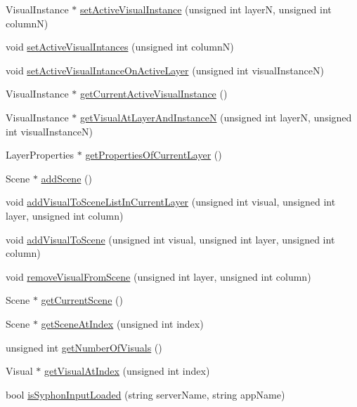 \begin{DoxyCompactItemize}
\item 
Visual\+Instance $\ast$ \hyperlink{class_engine_a8527a1c21e96b85c113efac943f83039}{set\+Active\+Visual\+Instance} (unsigned int layerN, unsigned int columnN)
\item 
void \hyperlink{class_engine_a9f4d3c2ac126aa622fa464300d1d361c}{set\+Active\+Visual\+Intances} (unsigned int columnN)
\item 
void \hyperlink{class_engine_a4800f622ab7b7125d70aea8c0426dbb3}{set\+Active\+Visual\+Intance\+On\+Active\+Layer} (unsigned int visual\+InstanceN)
\item 
Visual\+Instance $\ast$ \hyperlink{class_engine_a0cd50c81fc1479d3afa3b847151fa086}{get\+Current\+Active\+Visual\+Instance} ()
\item 
Visual\+Instance $\ast$ \hyperlink{class_engine_acd81098a646a2918353c66a9bb86f63e}{get\+Visual\+At\+Layer\+And\+InstanceN} (unsigned int layerN, unsigned int visual\+InstanceN)
\item 
Layer\+Properties $\ast$ \hyperlink{class_engine_af1868ab55619c4eceb1dce26bd7a0182}{get\+Properties\+Of\+Current\+Layer} ()
\item 
Scene $\ast$ \hyperlink{class_engine_a4e9d4666046294e3d2ce91b21ce67571}{add\+Scene} ()
\item 
void \hyperlink{class_engine_a6e9b7c17e564a3f10c9cb7301d64ecb4}{add\+Visual\+To\+Scene\+List\+In\+Current\+Layer} (unsigned int visual, unsigned int layer, unsigned int column)
\item 
void \hyperlink{class_engine_afc245ab31c528fe807f45309772de07b}{add\+Visual\+To\+Scene} (unsigned int visual, unsigned int layer, unsigned int column)
\item 
void \hyperlink{class_engine_af8b450a6e2bb5979b4216a143e010045}{remove\+Visual\+From\+Scene} (unsigned int layer, unsigned int column)
\item 
Scene $\ast$ \hyperlink{class_engine_ab81eff238bf568d470ba149e51be0c45}{get\+Current\+Scene} ()
\item 
Scene $\ast$ \hyperlink{class_engine_a161746a86c8a635a1552f6184a9381e6}{get\+Scene\+At\+Index} (unsigned int index)
\item 
unsigned int \hyperlink{class_engine_a02161314b59b98413587878fbe74bda0}{get\+Number\+Of\+Visuals} ()
\item 
Visual $\ast$ \hyperlink{class_engine_a3104acd7a59d71021bc513e6a48b6536}{get\+Visual\+At\+Index} (unsigned int index)
\item 
bool \hyperlink{class_engine_a3c973c85ef1912fc5d50c582ddb2d135}{is\+Syphon\+Input\+Loaded} (string server\+Name, string app\+Name)

\end{DoxyCompactItemize}
